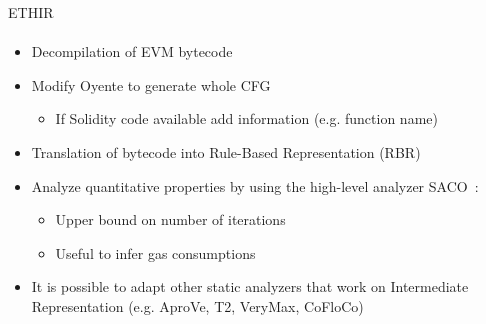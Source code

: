 \begin{frame}{ETHIR}
\framesubtitle{\cite{bib:vyper-docs}}
	\begin{itemize}
		\item Decompilation of EVM bytecode
		\item Modify Oyente to generate whole CFG
		\begin{itemize}
			\item If Solidity code available add information (e.g. function
			name)
		\end{itemize}
		\item Translation of bytecode into Rule-Based Representation (RBR)
		\item Analyze quantitative properties by using the high-level analyzer
		SACO~\cite{bib:SACO}:
		\begin{itemize}
			\item Upper bound on number of iterations
			\item Useful to infer gas consumptions
		\end{itemize}
		\item It is possible to adapt other static analyzers that work on
		Intermediate Representation (e.g. AproVe, T2, VeryMax, CoFloCo)
	\end{itemize}
\end{frame}
